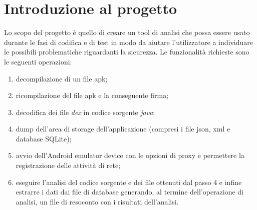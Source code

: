 
\section{Introduzione al progetto}\label{sec:introduzione-al-progetto}
Lo scopo del progetto è quello di creare un tool di analisi che possa essere usato durante le fasi di codifica e di test in modo da aiutare l'utilizzatore a individuare le possibili problematiche riguardanti la sicurezza.
Le funzionalità richieste sono le seguenti operazioni:
\begin{enumerate}
    \item decompilazione di un file apk;
    \item ricompilazione del file apk e la conseguente firma;
    \item decodifica dei file \textit{dex} in codice sorgente \textit{java};
    \item dump dell'area di storage dell'applicazione (compresi i file json, xml e database SQLite);
    \item avvio dell'Android emulator device con le opzioni di proxy e permettere la registrazione delle attività di rete;
    \item eseguire l'analisi del codice sorgente e dei file ottenuti dal passo 4 e infine estrarre i dati dai file di database generando, al termine dell'operazione di analisi, un file di resoconto con i risultati dell'analisi.
\end{enumerate}